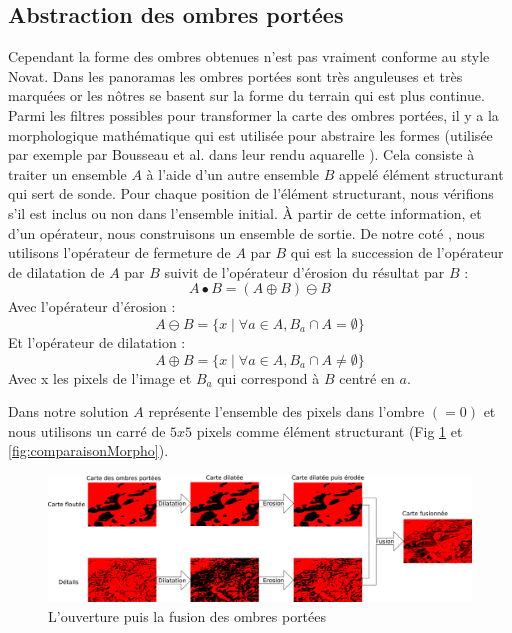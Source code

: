 \subsection{Abstraction des ombres portées }

Cependant la forme des ombres obtenues n'est pas vraiment conforme au style Novat. Dans les panoramas les ombres portées sont très anguleuses et très marquées or les nôtres se basent sur la forme du terrain qui est plus continue. Parmi les filtres possibles pour transformer la carte des ombres portées, il y a la morphologique mathématique qui est utilisée pour abstraire les formes (utilisée par exemple par Bousseau et al. dans leur rendu aquarelle \cite{bousseau2006interactive}). Cela consiste à traiter un ensemble $A$ à l'aide d'un autre ensemble $B$ appelé élément structurant qui sert de sonde. Pour chaque position de l’élément structurant, nous vérifions s'il est inclus ou non dans l'ensemble initial. À partir de cette information, et d'un opérateur, nous construisons un ensemble de sortie. De notre coté , nous utilisons l’opérateur de fermeture de $A$ par $B$ qui est la succession de l’opérateur de dilatation de $A$ par $B$ suivit de l’opérateur d’érosion du résultat par $B$ :
\begin{equation} 
A \bullet B  = (A \oplus B) \ominus B
\end{equation}
Avec l’opérateur d’érosion : 
\begin{equation} 
A \ominus B  = \{ x \mid \forall a \in A, B_a \cap A = \emptyset   \}
\end{equation}
Et l’opérateur de dilatation : 
\begin{equation} 
A \oplus B  = \{x \mid \forall a \in A, B_a \cap A \neq \emptyset  \}
\end{equation}
Avec x les pixels de l'image et $B_a$ qui correspond à $B$ centré en $a$. 



Dans notre solution $A$ représente l'ensemble des pixels dans l'ombre $(=0)$ et nous utilisons un carré de $5x5$ pixels comme élément structurant (Fig \ref{fig:pyramide_morpho} et \ref{fig:comparaisonMorpho}).
\begin{figure}[h!]
\centering
\includegraphics[width=1.0\linewidth]{Solution/pyramide_Laplace_image_morpho.png}

\caption{\label{fig:pyramide_morpho}L'ouverture puis la fusion des ombres portées}
\end{figure}


